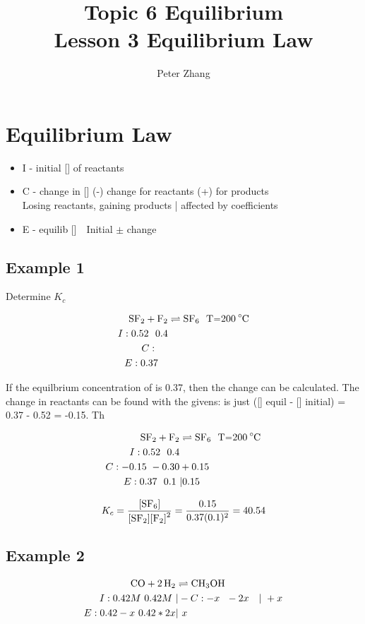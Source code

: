 \documentclass{article}
\title{Topic 6 Equilibrium\\Lesson 3 Equilibrium Law}
\author{Peter Zhang}
\begin{document}
\maketitle
\tableofcontents
\newpage

\section{Equilibrium Law}
\begin{itemize}
\item I - initial [] of reactants
\item C - change in [] (-) change for reactants (+) for products\\Losing reactants, gaining products | affected by coefficients
\item E - equilib []\ \ Initial $\pm$ change
\end{itemize}

\subsection{Example 1}

Determine $K_{c}$

\begin{align*}
\ce{SF2 + F2} &\rightleftharpoons \ce{SF6\ \ T=200^\circ C}\\
I: 0.52\ \ 0.4 & \\
C: \ \ \ \ & \\
E: 0.37\ \ \ & 
\end{align*}

If the equilbrium concentration of  is 0.37, then the change can be calculated. The change in reactants can be found with the givens:  is just ([] equil - [] initial) = 0.37 - 0.52 = -0.15. Th 

\begin{align*}
\ce{SF2 + F2} &\rightleftharpoons \ce{SF6\ \ T=200^\circ C}\\
I: 0.52\ \ 0.4 & \\
C: -0.15\ -0.30& +0.15\\
E: 0.37\ \ 0.1\ &|  0.15
\end{align*}

$$K_{c} = \ce{\frac{[SF6]}{[SF2][F2]^{2}}} = \frac{0.15}{0.37(0.1)^2} = 40.54$$


\subsection{Example 2}
\begin{align*}
\ce{CO + 2H2} &\rightleftharpoons \ce{CH3OH}\\
I: 0.42M\ 0.42M\ &| -
C: -x\ \ -2x&|\ +x\\
E: 0.42-x\ 0.42 * 2x &|\ x
\end{align*}
\end{document}
